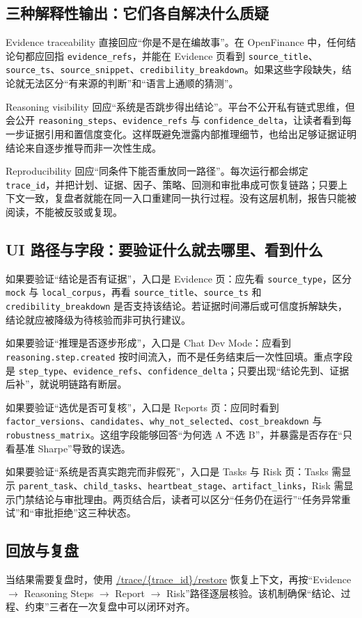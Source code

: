 \documentclass{article}
\newcommand{\tok}[1]{\nolinkurl{#1}}
\begin{document}
\subsection{三种解释性输出：它们各自解决什么质疑}
Evidence traceability 直接回应“你是不是在编故事”。在 OpenFinance 中，任何结论句都应回指 \tok{evidence_refs}，并能在 Evidence 页看到 \tok{source_title}、\tok{source_ts}、\tok{source_snippet}、\tok{credibility_breakdown}。如果这些字段缺失，结论就无法区分“有来源的判断”和“语言上通顺的猜测”。

Reasoning visibility 回应“系统是否跳步得出结论”。平台不公开私有链式思维，但会公开 \tok{reasoning_steps}、\tok{evidence_refs} 与 \tok{confidence_delta}，让读者看到每一步证据引用和置信度变化。这样既避免泄露内部推理细节，也给出足够证据证明结论来自逐步推导而非一次性生成。

Reproducibility 回应“同条件下能否重放同一路径”。每次运行都会绑定 \tok{trace_id}，并把计划、证据、因子、策略、回测和审批串成可恢复链路；只要上下文一致，复盘者就能在同一入口重建同一执行过程。没有这层机制，报告只能被阅读，不能被反驳或复现。

\subsection{UI 路径与字段：要验证什么就去哪里、看到什么}
如果要验证“结论是否有证据”，入口是 Evidence 页：应先看 \tok{source_type}，区分 \tok{mock} 与 \tok{local_corpus}，再看 \tok{source_title}、\tok{source_ts} 和 \tok{credibility_breakdown} 是否支持该结论。若证据时间滞后或可信度拆解缺失，结论就应被降级为待核验而非可执行建议。

如果要验证“推理是否逐步形成”，入口是 Chat Dev Mode：应看到 \tok{reasoning.step.created} 按时间流入，而不是任务结束后一次性回填。重点字段是 \tok{step_type}、\tok{evidence_refs}、\tok{confidence_delta}；只要出现“结论先到、证据后补”，就说明链路有断层。

如果要验证“选优是否可复核”，入口是 Reports 页：应同时看到 \tok{factor_versions}、\tok{candidates}、\tok{why_not_selected}、\tok{cost_breakdown} 与 \tok{robustness_matrix}。这组字段能够回答“为何选 A 不选 B”，并暴露是否存在“只看基准 Sharpe”导致的误选。

如果要验证“系统是否真实跑完而非假死”，入口是 Tasks 与 Risk 页：Tasks 需显示 \tok{parent_task}、\tok{child_tasks}、\tok{heartbeat_stage}、\tok{artifact_links}，Risk 需显示门禁结论与审批理由。两页结合后，读者可以区分“任务仍在运行”“任务异常重试”和“审批拒绝”这三种状态。

\subsection{回放与复盘}
当结果需要复盘时，使用 \url{/trace/\{trace_id\}/restore} 恢复上下文，再按“Evidence $\rightarrow$ Reasoning Steps $\rightarrow$ Report $\rightarrow$ Risk”路径逐层核验。该机制确保“结论、过程、约束”三者在一次复盘中可以闭环对齐。
\end{document}
